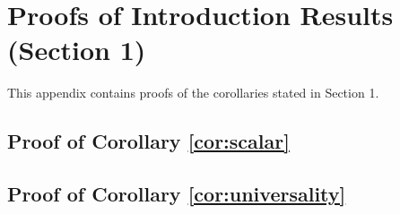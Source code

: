 
\section{Proofs of Introduction Results (Section 1)}

This appendix contains proofs of the corollaries stated in Section 1.

\subsection{Proof of Corollary \ref{cor:scalar}}


\subsection{Proof of Corollary \ref{cor:universality}}

